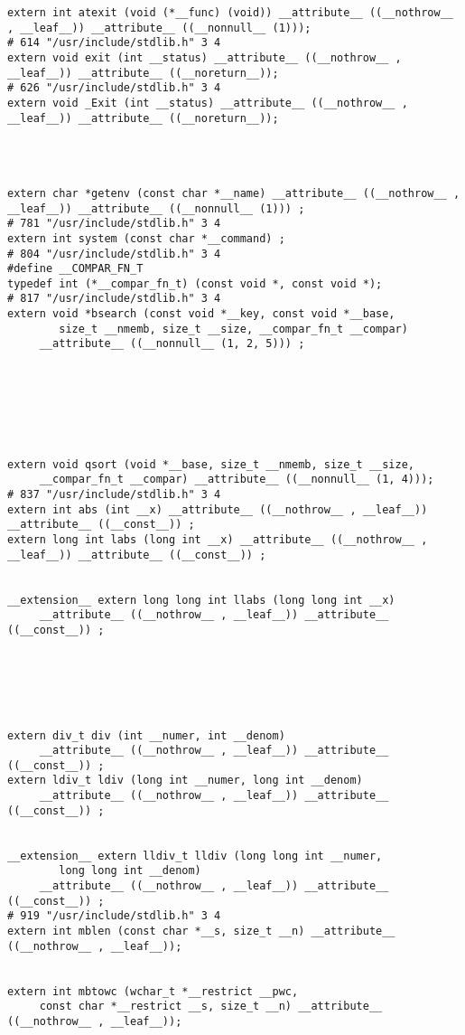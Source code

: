 \documentclass[11pt]{article}
\begin{document}
\begin{enumerate}
\begin{verbatim}
extern int atexit (void (*__func) (void)) __attribute__ ((__nothrow__ , __leaf__)) __attribute__ ((__nonnull__ (1)));
# 614 "/usr/include/stdlib.h" 3 4
extern void exit (int __status) __attribute__ ((__nothrow__ , __leaf__)) __attribute__ ((__noreturn__));
# 626 "/usr/include/stdlib.h" 3 4
extern void _Exit (int __status) __attribute__ ((__nothrow__ , __leaf__)) __attribute__ ((__noreturn__));




extern char *getenv (const char *__name) __attribute__ ((__nothrow__ , __leaf__)) __attribute__ ((__nonnull__ (1))) ;
# 781 "/usr/include/stdlib.h" 3 4
extern int system (const char *__command) ;
# 804 "/usr/include/stdlib.h" 3 4
#define __COMPAR_FN_T 
typedef int (*__compar_fn_t) (const void *, const void *);
# 817 "/usr/include/stdlib.h" 3 4
extern void *bsearch (const void *__key, const void *__base,
        size_t __nmemb, size_t __size, __compar_fn_t __compar)
     __attribute__ ((__nonnull__ (1, 2, 5))) ;







extern void qsort (void *__base, size_t __nmemb, size_t __size,
     __compar_fn_t __compar) __attribute__ ((__nonnull__ (1, 4)));
# 837 "/usr/include/stdlib.h" 3 4
extern int abs (int __x) __attribute__ ((__nothrow__ , __leaf__)) __attribute__ ((__const__)) ;
extern long int labs (long int __x) __attribute__ ((__nothrow__ , __leaf__)) __attribute__ ((__const__)) ;


__extension__ extern long long int llabs (long long int __x)
     __attribute__ ((__nothrow__ , __leaf__)) __attribute__ ((__const__)) ;






extern div_t div (int __numer, int __denom)
     __attribute__ ((__nothrow__ , __leaf__)) __attribute__ ((__const__)) ;
extern ldiv_t ldiv (long int __numer, long int __denom)
     __attribute__ ((__nothrow__ , __leaf__)) __attribute__ ((__const__)) ;


__extension__ extern lldiv_t lldiv (long long int __numer,
        long long int __denom)
     __attribute__ ((__nothrow__ , __leaf__)) __attribute__ ((__const__)) ;
# 919 "/usr/include/stdlib.h" 3 4
extern int mblen (const char *__s, size_t __n) __attribute__ ((__nothrow__ , __leaf__));


extern int mbtowc (wchar_t *__restrict __pwc,
     const char *__restrict __s, size_t __n) __attribute__ ((__nothrow__ , __leaf__));



\end{verbatim}
\end{enumerate}
\end{document}
